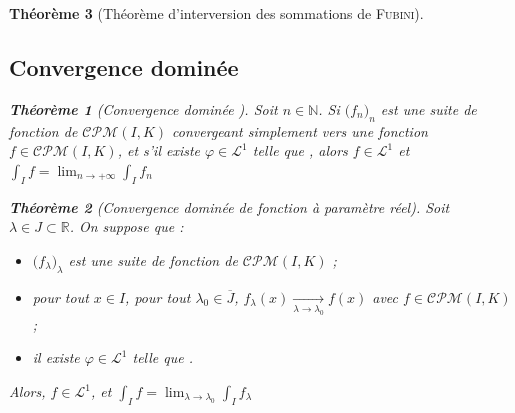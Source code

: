\documentclass[11pt,a4paper]{report}
\newtheorem{theorem}{Théorème}[chapter]
\newtheorem{itheorem}[theorem]{Théorème}
\theoremstyle{definition}
\begin{document}
\begin{theorem}[Théorème d'interversion des sommations de \textsc{Fubini}]
{{\subsection{Convergence dominée} %
\label{sub:convergence_dominee}
\begin{itheorem}[Convergence dominée ]
\label{thm:convergence_dominee}
    Soit $n\in \mathbb{N}$. Si $\big( f_n \big)_n$ est une suite de fonction de $\mathcal{CPM}(I,K) $ convergeant simplement vers une fonction $f \in \mathcal{CPM}(I,K)$, et s'il existe $\varphi \in \mathcal{L}^1 $ telle que ,\newline
    alors $f \in \mathcal{L}^1$ et $\int_I f = \lim_{n \to +\infty} \int_I f_n$
\end{itheorem}
\begin{theorem}[Convergence dominée de fonction à paramètre réel]
\label{thm:convergence_dominee_reel}
    Soit $\lambda\in J\subset \ensuremath{\mathbb{R}}$. On suppose que :
    \begin{itemize}
        \item $\big( f_\lambda \big)_\lambda$ est une suite de fonction de $\mathcal{CPM}(I,K)$ ;
        \item pour tout $x\in I$, pour tout $\lambda_0\in \overline{J}$, $f_\lambda (x) \xrightarrow[\lambda \to \lambda_0]{} f (x)$ avec $f \in \mathcal{CPM}(I,K)$ ;
        \item il existe $\varphi \in \mathcal{L}^1 $ telle que .
    \end{itemize}
    Alors, $f \in \mathcal{L}^1$, et $\int_I f = \lim_{\lambda \to \lambda_0} \int_I f_\lambda$
\end{theorem}

}}
\end{theorem}
\end{document}
